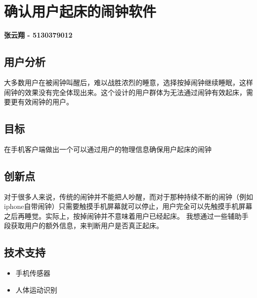 \documentclass{article} \usepackage{CJK}
\begin{document}
\section{确认用户起床的闹钟软件}
\textbf{张云翔 - 5130379012}
\subsection{用户分析}
大多数用户在被闹钟叫醒后，难以战胜浓烈的睡意，选择按掉闹钟继续睡眠，这样闹钟的效果没有完全体现出来。这个设计的用户群体为无法通过闹钟有效起床，需要更有效闹钟的用户。
\subsection{目标}
在手机客户端做出一个可以通过用户的物理信息确保用户起床的闹钟
\subsection{创新点}
对于很多人来说，传统的闹钟并不能把人吵醒，而对于那种持续不断的闹钟（例如iphone自带闹钟）只需要触摸手机屏幕就可以停止，用户完全可以先触摸手机屏幕之后再睡觉。实际上，按掉闹钟并不意味着用户已经起床。
我想通过一些辅助手段获取用户的额外信息，来判断用户是否真正起床。
\subsection{技术支持}
\begin{itemize}
  \item 手机传感器
  \item 人体运动识别
\end{itemize}
\end{document}
